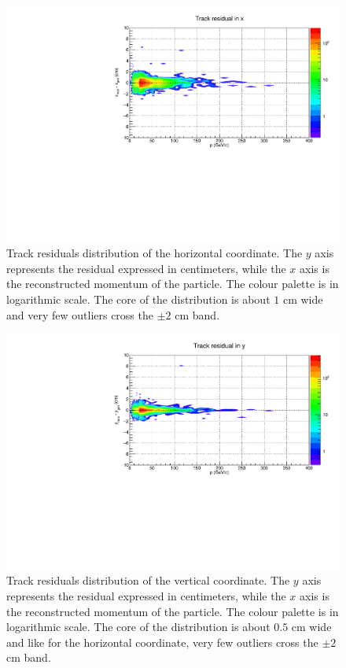 \begin{figure}[!t]
\begin{center}
\includegraphics[width=0.99\linewidth]{Chapters/O2/Figs/TRx.pdf}
\caption{Track residuals distribution of the horizontal coordinate. The $y$ axis represents the residual expressed in centimeters, while the $x$ axis is the reconstructed momentum of the particle. The colour palette is in logarithmic scale.
The core of the distribution is about $1$ cm wide and very few outliers cross the $\pm2$ cm band.}
\label{fig:MID_xpoint_x}
\end{center}
\end{figure}

\begin{figure}[!t]
\begin{center}
\includegraphics[width=0.99\linewidth]{Chapters/O2/Figs/TRy.pdf}
\caption{Track residuals distribution of the vertical coordinate. The $y$ axis represents the residual expressed in centimeters, while the $x$ axis is the reconstructed momentum of the particle. The colour palette is in logarithmic scale.
The core of the distribution is about $0.5$ cm wide and like for the horizontal coordinate, very few outliers cross the $\pm2$ cm band.}
\label{fig:MID_xpoint_y}
\end{center}
\end{figure}

